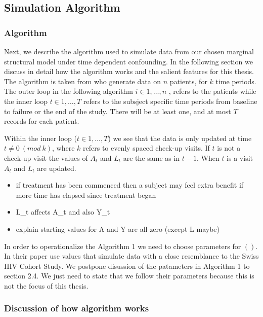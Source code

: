 \documentclass[11pt]{article}
\providecommand{\tightlist}{%
      \setlength{\itemsep}{0pt}\setlength{\parskip}{0pt}}
\begin{document}
\subsection{Simulation Algorithm}\label{simulation-algorithm}

\subsubsection{Algorithm}\label{algorithm}

Next, we describe the algorithm used to simulate data from our chosen
marginal structural model under time dependent confounding. In the
following section we discuss in detail how the algorithm works and the
salient features for this thesis. The algorithm is taken from
\citet{Havercroft2012} who generate data on \(n\) patients, for \(k\)
time periods. The outer loop in the following algorithm
\(i \in {1, \dots, n}\) , refers to the patients while the inner loop
\(t \in {1, \dots, T}\) refers to the subsject specific time periods
from baseline to failure or the end of the study. There will be at least
one, and at most \(T\) records for each patient.

Within the inner loop (\(t \in {1, \dots, T}\)) we see that the data is
only updated at time \(t \neq 0\ (mod\ k)\), where \(k\) refers to
evenly spaced check-up visits. If \(t\) is not a check-up visit the
values of \(A_t\) and \(L_t\) are the same as in \(t-1\). When \(t\) is
a visit \(A_t\) and \(L_t\) are updated.

\begin{itemize}
\tightlist
\item
  if treatment has been commenced then a subject may feel extra benefit
  if more time has elapsed since treatment began
\item
  L\_t affects A\_t and also Y\_t
\item
  explain starting values for A and Y are all zero (except L maybe)
\end{itemize}

In order to operationalize the Algorithm 1 we need to choose parameters
for \(()\). In their paper \citet{Havercroft2012} use values that
simulate data with a close resemblance to the Swiss HIV Cohort Study. We
postpone disussion of the patameters in Algorithm 1 to section 2.4. We
just need to state that we follow their parameters because this is not
the focus of this thesis.

\subsubsection{Discussion of how algorithm
works}\label{discussion-of-how-algorithm-works}
\end{document}

